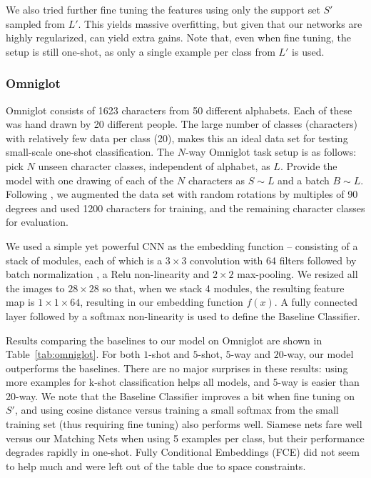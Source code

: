 We also tried further fine tuning the features using only the support set $S'$ sampled from $L'$. This yields massive overfitting, but given that our networks are highly regularized, can yield extra gains. Note that, even when fine tuning, the setup is still one-shot, as only a single example per class from $L'$ is used.

\subsubsection{Omniglot}

Omniglot \cite{omniglot} consists of 1623 characters from 50 different alphabets.
Each of these was hand drawn by 20 different people.
The large number of classes (characters) with relatively few data per class (20),
makes this an ideal data set for testing small-scale one-shot classification.
The $N$-way Omniglot task setup is as follows: pick $N$ unseen character classes, independent of alphabet, as $L$.
Provide the model with one drawing of each of the $N$ characters as $S \sim L$ and a batch $B \sim L$.
Following \cite{mann},  we augmented the data set with random rotations by multiples of 90 degrees and used 1200 characters for training, and the remaining character classes for evaluation.

We used a simple yet powerful CNN as the embedding function -- consisting of a stack of modules, each of which is a $3\times 3$ convolution with 64 filters followed by batch normalization \cite{ioffe2015batch}, a Relu non-linearity and $2\times 2$ max-pooling. We resized all the images to $28\times 28$ so that, when we stack 4 modules, the resulting feature map is $1\times 1\times 64$, resulting in our embedding function $f(x)$. A fully connected layer followed by a softmax non-linearity is used to define the Baseline Classifier.

Results comparing the baselines to our model on Omniglot are shown in Table~\ref{tab:omniglot}.
For both $1$-shot and $5$-shot, $5$-way and $20$-way, our model outperforms the baselines. There are no major surprises in these results: using more examples for k-shot classification helps all models, and 5-way is easier than 20-way. We note that the Baseline Classifier improves a bit when fine tuning on $S'$, and using cosine distance versus training a small softmax from the small training set (thus requiring fine tuning) also performs well. Siamese nets fare well versus our Matching Nets when using 5 examples per class, but their performance degrades rapidly in one-shot. Fully Conditional Embeddings (FCE) did not seem to help much and were left out of the table due to space constraints.

